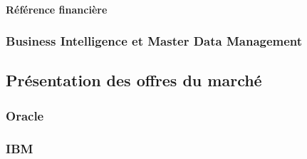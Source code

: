 \paragraph{Référence financière}

\subsubsection{Business Intelligence et Master Data Management}

\subsection{Présentation des offres du marché}

\subsubsection{Oracle}

\subsubsection{IBM}


